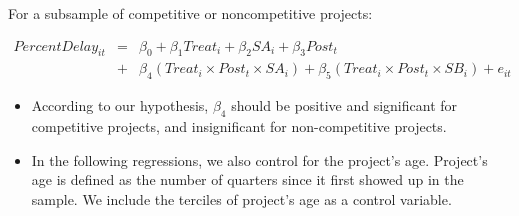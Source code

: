 \documentclass[
]{article}
\begin{document}
For a subsample of competitive or noncompetitive projects:

\[ \begin{aligned} PercentDelay_{it} &=& \beta_0 +\beta_1 Treat_i+ \beta_2 SA_i+ \beta_3 Post_t \\&+& \beta_4 (Treat_i \times Post_t \times SA_i )+\beta_5 (Treat_i \times Post_t \times SB_i )+e_{it} \end{aligned} \]

\begin{itemize}
\item
  According to our hypothesis, \(\beta_4\) should be positive and
  significant for competitive projects, and insignificant for
  non-competitive projects.
\item
  In the following regressions, we also control for the project's age.
  Project's age is defined as the number of quarters since it first
  showed up in the sample. We include the terciles of project's age as a
  control variable.
\end{itemize}
\end{document}
